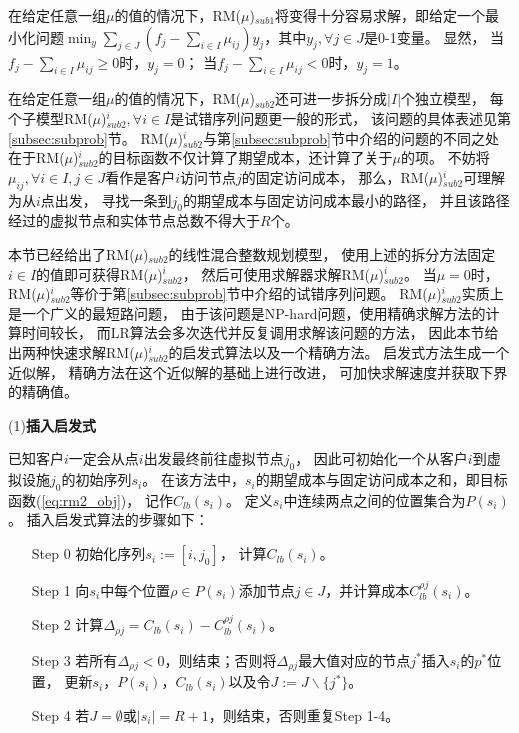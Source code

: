 在给定任意一组$\mu$的值的情况下，RM($\mu$)$_{sub1}$将变得十分容易求解，即给定一个最小化问题$\min_{y} \sum_{j\in J} (f_j  - \sum_{i\in I}\mu_{ij}) y_j$，其中$y_j,\forall j \in J$是0-1变量。
显然，
当$f_j - \sum_{i\in I}\mu_{ij} \ge 0 $时，$y_j=0$；
当$f_j - \sum_{i\in I}\mu_{ij} < 0 $时，$y_j=1$。

在给定任意一组$\mu$的值的情况下，RM($\mu$)$_{sub2}$还可进一步拆分成$|I|$个独立模型，
每个子模型RM($\mu$)$_{sub2}^i, \forall i \in I$是试错序列问题更一般的形式，
该问题的具体表述见第\ref{subsec:subprob}节。
RM($\mu$)$_{sub2}^i$与第\ref{subsec:subprob}节中介绍的问题的不同之处在于RM($\mu$)$_{sub2}^i$的目标函数不仅计算了期望成本，还计算了关于$\mu$的项。
不妨将$\mu_{ij}, \forall i \in I , j \in J$看作是客户$i$访问节点$j$的固定访问成本，
那么，RM($\mu$)$_{sub2}^i$可理解为从$i$点出发，
寻找一条到$j_0$的期望成本与固定访问成本最小的路径，
并且该路径经过的虚拟节点和实体节点总数不得大于$R$个。

本节已经给出了RM($\mu$)$_{sub2}$的线性混合整数规划模型，
使用上述的拆分方法固定$i\in I$的值即可获得RM($\mu$)$_{sub2}^i$，
然后可使用求解器求解RM($\mu$)$_{sub2}^i$。
当$\mu=0$时，
RM($\mu$)$_{sub2}^i$等价于第\ref{subsec:subprob}节中介绍的试错序列问题。
RM($\mu$)$_{sub2}^i$实质上是一个广义的最短路问题，
由于该问题是NP-hard问题，使用精确求解方法的计算时间较长，
而LR算法会多次迭代并反复调用求解该问题的方法，
因此本节给出两种快速求解RM($\mu$)$_{sub2}^i$的启发式算法以及一个精确方法。
启发式方法生成一个近似解，
精确方法在这个近似解的基础上进行改进，
可加快求解速度并获取下界的精确值。

(1){\textbf{插入启发式}}

已知客户$i$一定会从点$i$出发最终前往虚拟节点$j_0$，
因此可初始化一个从客户$i$到虚拟设施$j_0$的初始序列$s_i$。
在该方法中，$s_i$的期望成本与固定访问成本之和，即目标函数(\ref{eq:rm2_obj})，
记作$C_{lb}(s_i)$。
定义$s_i$中连续两点之间的位置集合为$P(s_i)$。
插入启发式算法的步骤如下：
\begin{enumerate}[leftmargin=0pt,itemindent=3.5\ccwd,nosep]
  \item[Step 0] 初始化序列$s_i:=[i,j_0]$， 计算$C_{lb}(s_i)$。
  \item[Step 1] 向$s_i$中每个位置$\rho \in P(s_i)$添加节点$j \in J$，并计算成本$C_{lb}^{\rho j}(s_i)$。
  \item[Step 2] 计算$\Delta_{\rho j} = C_{lb}(s_i) - C_{lb}^{\rho j}(s_i)$。
  \item[Step 3] 若所有$\Delta_{\rho j}<0$，则结束；否则将$\Delta_{\rho j}$最大值对应的节点$j^*$插入$s_i$的$p^*$位置，
  更新$s_i$，$P(s_i)$，$C_{lb}(s_i)$以及令$J:=J\backslash\{j^*\}$。
  \item[Step 4] 若$J=\emptyset$或$|s_i|=R+1$，则结束，否则重复Step 1-4。
\end{enumerate}

